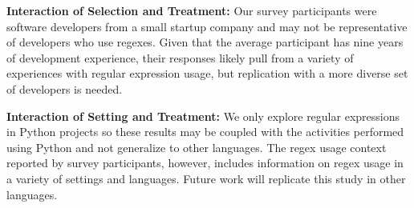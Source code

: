 \documentclass{sig-alternate-05-2015}
\begin{document}



\textbf{Interaction of Selection and Treatment:} Our survey participants were software developers from a small startup company and may not be representative of developers who use regexes. Given that the average participant has nine years of development experience, their responses likely pull from a variety of experiences with regular expression usage, but replication with a more diverse set of developers is needed.

\textbf{Interaction of Setting and Treatment:}
We only explore regular expressions in Python projects so these results may be coupled with the activities performed using Python and not generalize to other languages. The regex usage context reported by survey participants, however, includes information on  regex usage in a  variety of settings and languages. Future work will replicate this study in other languages. 



%
%
%


\end{document}
